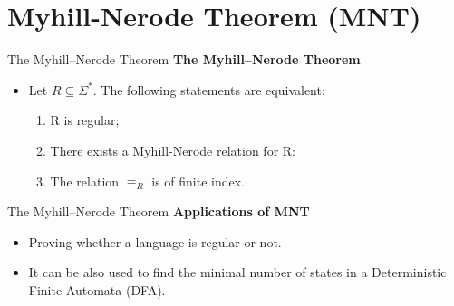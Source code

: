 \documentclass{beamer}
\begin{document}
\section{Myhill-Nerode Theorem (MNT)}
\begin{frame}{The Myhill–Nerode Theorem}
	\textbf{The Myhill–Nerode Theorem}
	\begin{itemize}
		\item Let $R \subseteq \Sigma^*$. The following statements
		are equivalent:
		\begin{enumerate}
			\item R is regular;
			\item  There exists a Myhill-Nerode relation for R:
			\item The relation $\equiv_R$ is of finite index.
		\end{enumerate}
	\end{itemize}
\end{frame}	
\begin{frame}{The Myhill–Nerode Theorem}
	\textbf{Applications of MNT}
	\begin{itemize}
		\item Proving whether a language is regular or not.
		\item It can be also used to find the minimal number of states in a Deterministic Finite Automata (DFA).
	\end{itemize}
\end{frame}	
\end{document}
